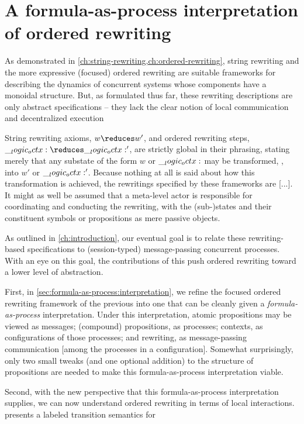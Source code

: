\chapter{A formula-as-process interpretation of ordered rewriting}\label{ch:formula-as-process}

As demonstrated in \cref{ch:string-rewriting,ch:ordered-rewriting}, string rewriting and the more expressive (focused) ordered rewriting are suitable frameworks for describing the dynamics of concurrent systems whose components have a monoidal structure.
But, as formulated thus far, these rewriting descriptions are only abstract specifications -- they lack the clear notion of local communication and decentralized execution

String rewriting axioms, $w \reduces w'$, and ordered rewriting steps, $\octx \reduces \octx'$, are strictly global in their phrasing, stating merely that any substate of the form $w$ or $\__logic_octx:$ may be transformed, , into $w'$ or $\__logic_octx:'$.
Because nothing at all is said about how this transformation is achieved, the rewritings specified by these frameworks are [...].
It might as well be assumed that a meta-level actor is responsible for coordinating and conducting the rewriting, with the (sub-)states and their constituent symbols or propositions as mere passive objects.

As outlined in \cref{ch:introduction}, our eventual goal is to relate these rewriting-based specifications to (session-typed) message-passing concurrent processes.
With an eye on this goal, the contributions of this  push ordered rewriting toward a lower level of abstraction.

First, in \cref{sec:formula-as-process:interpretation}, we refine the focused ordered rewriting framework of the previous  into one that can be cleanly given a \emph{formula-as-process} interpretation\autocites{Miller:??}{Cervesato+Scedrov:IC09}.
Under this interpretation, atomic propositions may be viewed as messages; (compound) propositions, as processes; contexts, as configurations of those processes; and rewriting, as message-passing communication [among the processes in a configuration].
Somewhat surprisingly, only two small tweaks (and one optional addition) to the structure of propositions are needed to make this formula-as-process interpretation viable.

Second, with the new perspective that this formula-as-process interpretation supplies, we can now understand ordered rewriting in terms of local interactions.
 presents a labeled transition semantics for

